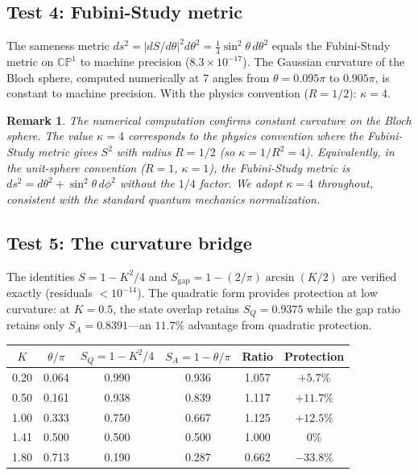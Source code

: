 \documentclass[11pt,letterpaper]{article}
\newtheorem{remark}[theorem]{Remark}
\begin{document}
\subsection{Test 4: Fubini-Study metric}

The sameness metric $ds^2 = |dS/d\theta|^2 d\theta^2 = \frac{1}{4}\sin^2\theta\,d\theta^2$ equals the Fubini-Study metric on $\mathbb{CP}^1$ to machine precision ($8.3 \times 10^{-17}$). The Gaussian curvature of the Bloch sphere, computed numerically at 7 angles from $\theta = 0.095\pi$ to $0.905\pi$, is constant to machine precision. With the physics convention ($R = 1/2$): $\kappa = 4$.

\begin{remark}
The numerical computation confirms constant curvature on the Bloch sphere. The value $\kappa = 4$ corresponds to the physics convention where the Fubini-Study metric gives $S^2$ with radius $R = 1/2$ (so $\kappa = 1/R^2 = 4$). Equivalently, in the unit-sphere convention ($R = 1$, $\kappa = 1$), the Fubini-Study metric is $ds^2 = d\theta^2 + \sin^2\theta\,d\phi^2$ without the $1/4$ factor. We adopt $\kappa = 4$ throughout, consistent with the standard quantum mechanics normalization.
\end{remark}

\subsection{Test 5: The curvature bridge}

The identities $S = 1 - K^2/4$ and $S_{\text{gap}} = 1 - (2/\pi)\arcsin(K/2)$ are verified exactly (residuals $< 10^{-14}$). The quadratic form provides protection at low curvature: at $K = 0.5$, the state overlap retains $S_Q = 0.9375$ while the gap ratio retains only $S_A = 0.8391$---an $11.7\%$ advantage from quadratic protection.

\begin{center}
\begin{tabular}{cccccc}
\toprule
$K$ & $\theta/\pi$ & $S_Q = 1 - K^2/4$ & $S_A = 1 - \theta/\pi$ & Ratio & Protection \\
\midrule
0.20 & 0.064 & 0.990 & 0.936 & 1.057 & $+5.7\%$ \\
0.50 & 0.161 & 0.938 & 0.839 & 1.117 & $+11.7\%$ \\
1.00 & 0.333 & 0.750 & 0.667 & 1.125 & $+12.5\%$ \\
1.41 & 0.500 & 0.500 & 0.500 & 1.000 & $0\%$ \\
1.80 & 0.713 & 0.190 & 0.287 & 0.662 & $-33.8\%$ \\
\bottomrule
\end{tabular}
\end{center}
\end{document}
